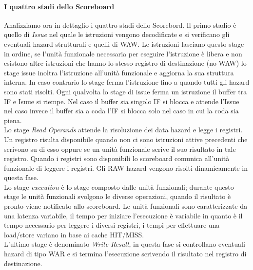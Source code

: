 \paragraph{I quattro stadi dello Scoreboard}
Analizziamo ora in dettaglio i quattro stadi dello Scorebord. Il primo stadio è quello di \emph{Issue} nel quale le istruzioni vengono decodificate e si verificano gli eventuali hazard strutturali e quelli di WAW. Le istruzioni lasciano questo stage in ordine, se l'unità funzionale necessaria per eseguire l'istruzione è libera e non esistono altre istruzioni che hanno lo stesso registro di destinazione (no WAW) lo stage issue inoltra l'istruzione all'unità funzionale e aggiorna la sua struttura interna. In caso contrario lo stage ferma l'istruzione fino a quando tutti gli hazard sono stati risolti. Ogni qualvolta lo stage di issue ferma un istruzione il buffer tra IF e Isuue si riempe. Nel caso il buffer sia singolo IF si blocca e attende l'Issue nel caso invece il buffer sia a coda l'IF si blocca solo nel caso in cui la coda sia piena.\\
Lo stage \emph{Read Operands} attende la risoluzione dei data hazard e legge i registri. Un registro risulta disponibile quando non ci sono istruzioni attive precedenti che scrivono su di esso oppure se un unità funzionale scrive il suo risultato in tale registro. Quando i registri sono disponibili lo scoreboard comunica all'unità funzionale di leggere i registri. Gli RAW hazard vengono risolti dinamicamente in questa fase.\\
Lo stage \emph{execution} è lo stage composto dalle unità funzionali; durante questo stage le unità funzionali svolgono le diverse operazioni, quando il risultato è pronto viene notificato allo scoreboard. Le unità funzionali sono caratterizzate da una latenza variabile, il tempo per iniziare l'esecuzione è variabile in quanto è il tempo necessario per leggere i diversi registri, i tempi per effettuare una load/store variano in base ai cache HIT/MISS.\\
L'ultimo stage è denominato \emph{Write Result}, in questa fase si controllano eventuali hazard di tipo WAR e si termina l'esecuzione scrivendo il risultato nel registro di destinazione.

